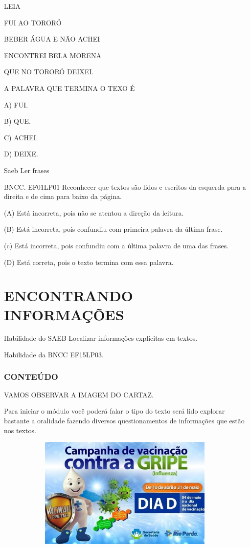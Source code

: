 \begin{escola}
LEIA

FUI AO TORORÓ

BEBER ÁGUA E NÃO ACHEI

ENCONTREI BELA MORENA

QUE NO TORORÓ DEIXEI.

A PALAVRA QUE TERMINA O TEXO É

A) FUI.

B) QUE.

C) ACHEI.

D) DEIXE.

Saeb Ler frases

BNCC. EF01LP01 Reconhecer que textos são lidos e escritos da esquerda
para a direita e de cima para baixo da página.

(A) Está incorreta, pois não se atentou a direção da leitura.

(B) Está incorreta, pois confundiu com primeira palavra da última frase.

(c) Está incorreta, pois confundiu com a última palavra de uma das
frases.

(D) Está correta, pois o texto termina com essa palavra.

\chapter{ENCONTRANDO INFORMAÇÕES}

\protect\hypertarget{_heading=h.lnxbz9}{}{}Habilidade do SAEB 
Localizar informações explícitas em textos.

Habilidade da BNCC 
EF15LP03.

\subsection{CONTEÚDO}\label{conteuxfado-2}

VAMOS OBSERVAR A IMAGEM DO CARTAZ.

\protect\hypertarget{_heading=h.35nkun2}{}{}Para iniciar o módulo você
poderá falar o tipo do texto será lido explorar bastante a oralidade
fazendo diversos questionamentos de informações que estão nos textos.

\includegraphics[width=5.14986in,height=2.17762in]{media/image124.jpg}


\end{escola}
